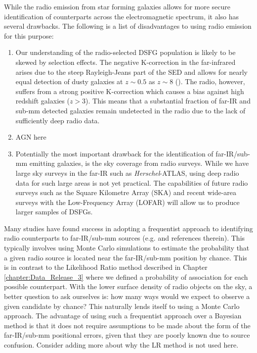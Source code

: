 While the radio emission from star forming galaxies allows for more secure identification of counterparts across the electromagnetic spectrum, it also has several drawbacks. The following is a list of disadvantages to using radio emission for this purpose:

\begin{enumerate}
    \item Our understanding of the radio-selected DSFG population is likely to be skewed by selection effects. The negative K-correction in the far-infrared arises due to the steep Rayleigh-Jeans part of the SED and allows for nearly equal detection of dusty galaxies at $z \sim 0.5$ as $z \sim 8$ (\citealt{Blain_2002}). The radio, however, suffers from a strong positive K-correction which causes a bias against high redshift galaxies ($z > 3$). This means that a substantial fraction of far-IR and sub-mm detected galaxies remain undetected in the radio due to the lack of sufficiently deep radio data.
    \item {\color{red}AGN here}
	\item Potentially the most important drawback for the identification of far-IR/sub-mm emitting galaxies, is the sky coverage from radio surveys. While we have large sky surveys in the far-IR such as \textit{Herschel}-ATLAS, using deep radio data for such large areas is not yet practical. The capabilities of future radio surveys such as the Square Kilometre Array (SKA) and recent wide-area surveys with the Low-Frequency Array (LOFAR) will allow us to produce larger samples of DSFGs.
\end{enumerate}

Many studies have found success in adopting a frequentist approach to identifying radio counterparts to far-IR/sub-mm sources (e.g. \citealt{Eales_2009, Dye_2009, Dunlop_2010} and references therein). This typically involves using Monte Carlo simulations to estimate the probability that a given radio source is located near the far-IR/sub-mm position by chance. This is in contrast to the Likelihood Ratio method described in Chapter \ref{chapter:Data_Release_3} where we defined a probability of association for each possible counterpart. With the lower surface density of radio objects on the sky, a better question to ask ourselves is: how many ways would we expect to observe a given candidate by chance? This naturally lends itself to using a Monte Carlo approach. The advantage of using such a frequentist approach over a Bayesian method is that it does not require assumptions to be made about the form of the far-IR/sub-mm positional errors, given that they are poorly known due to source confusion. {\color{red}Consider adding more about why the LR method is not used here.}

